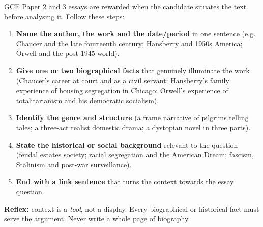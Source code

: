 \documentclass[11pt]{article}
\begin{document}
\begin{methode}
GCE Paper 2 and 3 essays are rewarded when the candidate situates the text before analysing it. Follow these steps:
\begin{enumerate}
\item \textbf{Name the author, the work and the date/period} in one sentence (e.g. Chaucer and the late fourteenth century; Hansberry and 1950s America; Orwell and the post-1945 world).
\item \textbf{Give one or two biographical facts} that genuinely illuminate the work (Chaucer's career at court and as a civil servant; Hansberry's family experience of housing segregation in Chicago; Orwell's experience of totalitarianism and his democratic socialism).
\item \textbf{Identify the genre and structure} (a frame narrative of pilgrims telling tales; a three-act realist domestic drama; a dystopian novel in three parts).
\item \textbf{State the historical or social background} relevant to the question (feudal estates society; racial segregation and the American Dream; fascism, Stalinism and post-war surveillance).
\item \textbf{End with a link sentence} that turns the context towards the essay question.
\end{enumerate}
\textbf{Reflex:} context is a \emph{tool}, not a display. Every biographical or historical fact must serve the argument. Never write a whole page of biography.
\end{methode}
\end{document}
